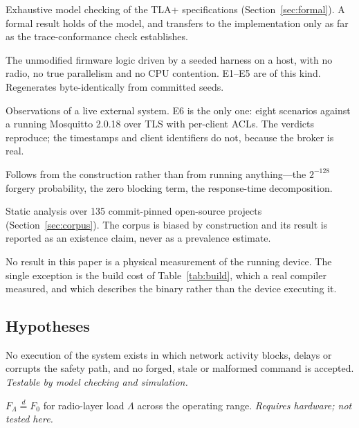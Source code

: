 \begin{description}[leftmargin=1.6em,itemsep=0.2em]
\item[Formal.] Exhaustive model checking of the TLA+ specifications (Section~\ref{sec:formal}).
A formal result holds of the model, and transfers to the implementation only as far as the
trace-conformance check establishes.
\item[Simulation.] The unmodified firmware logic driven by a seeded harness on a host, with no
radio, no true parallelism and no CPU contention. E1--E5 are of this kind. Regenerates
byte-identically from committed seeds.
\item[Testbed measurement.] Observations of a live external system. E6 is the only one: eight
scenarios against a running Mosquitto 2.0.18 over TLS with per-client ACLs. The verdicts
reproduce; the timestamps and client identifiers do not, because the broker is real.
\item[Analytical.] Follows from the construction rather than from running anything---the
$2^{-128}$ forgery probability, the zero blocking term, the response-time decomposition.
\item[Corpus study.] Static analysis over 135 commit-pinned open-source projects
(Section~\ref{sec:corpus}). The corpus is biased by construction and its result is reported as
an existence claim, never as a prevalence estimate.
\end{description}

\noindent No result in this paper is a physical measurement of the running device. The single
exception is the build cost of Table~\ref{tab:build}, which a real compiler measured, and
which describes the binary rather than the device executing it.

\subsection{Hypotheses}

\begin{description}[leftmargin=1.6em,itemsep=0.2em]
\item[H1 (logical isolation).] No execution of the system exists in which network activity
blocks, delays or corrupts the safety path, and no forged, stale or malformed command is
accepted. \emph{Testable by model checking and simulation.}
\item[H2 (timing isolation).] $F_{\Lambda} \stackrel{d}{=} F_{0}$ for radio-layer load $\Lambda$
across the operating range. \emph{Requires hardware; not tested here.}
\end{description}

